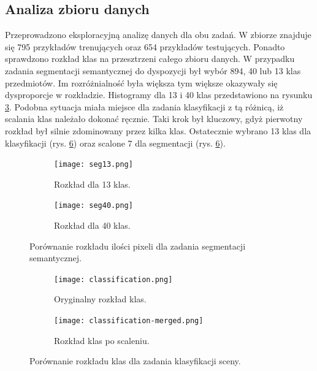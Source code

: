 \subsection{Analiza zbioru danych}
Przeprowadzono eksploracyjną analizę danych dla obu zadań. W zbiorze znajduje się 795 przykładów trenujących oraz 654 przykładów testujących. Ponadto sprawdzono rozkład klas na przesztrzeni całego zbioru danych.
W przypadku zadania segmentacji semantycznej do dyspozycji był wybór 894, 40 lub 13 klas przedmiotów. Im rozróżnialność była większa tym większe okazywały się dysproporcje w rozkładzie. Histogramy dla 13 i 40 klas przedstawiono na rysunku \ref{fig:rozklad-segm}.
Podobna sytuacja miała miejsce dla zadania klasyfikacji z tą różnicą, iż scalania klas należało dokonać ręcznie. Taki krok był kluczowy, gdyż pierwotny rozkład był silnie zdominowany przez kilka klas.
Ostatecznie wybrano 13 klas dla klasyfikacji (rys. \ref{fig:7 klas dystrybucja}) oraz scalone 7 dla segmentacji (rys. \ref{fig:7 klas dystrybucja}).
\begin{figure}
    \centering
    \begin{subfigure}[b]{0.49\textwidth}
        \centering
        \texttt{[image: seg13.png]}
        \caption{Rozkład dla 13 klas.}
        \label{fig:rozklad-13klas-seg}
    \end{subfigure}
    \hfill
    \begin{subfigure}[b]{0.49\textwidth}
        \centering
        \texttt{[image: seg40.png]}
        \caption{Rozkład dla 40 klas.}
        \label{fig:rozklad-40klas-seg}
    \end{subfigure}
    \caption[]{Porównanie rozkładu ilości pixeli dla zadania segmentacji semantycznej.}
    \label{fig:rozklad-segm}
\end{figure}
\begin{figure}
    \centering
    \begin{subfigure}[b]{0.49\textwidth}
        \centering
        \texttt{[image: classification.png]}
        \caption{Oryginalny rozkład klas.}
        \label{fig:27 klas dystrybucja}
    \end{subfigure}
    \hfill
    \begin{subfigure}[b]{0.49\textwidth}
        \centering
        \texttt{[image: classification-merged.png]}
        \caption{Rozkład klas po scaleniu.}
        \label{fig:7 klas dystrybucja}
    \end{subfigure}
    \caption[]{Porównanie rozkładu klas dla zadania klasyfikacji sceny.}
\end{figure}

